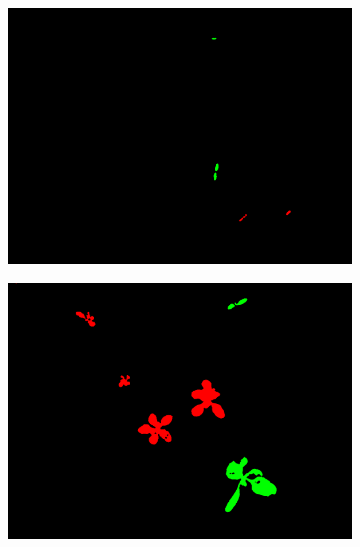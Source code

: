 \documentclass[letterpaper, 10 pt, conference]{ieeeconf}  %
\begin{document}
\begin{figure}
        \begin{subfigure}[b]{0.31\linewidth}
    \includegraphics[width=\linewidth]{pics/bonn/annotations/bonirob_2016-04-28-12-20-29_6_frame217.png}
   		\caption{}
		\label{bonn_lbl}    		
   \end{subfigure}
        \begin{subfigure}[b]{0.31\linewidth}
    \includegraphics[width=\linewidth]{pics/stuttgart/annotations/masks_8mm_fromImages_frame479_GroundTruth_iMap.png}
   		\caption{}
		\label{stuttgart_lbl}    		
   \end{subfigure}
        \begin{subfigure}[b]{0.31\linewidth}

\end{subfigure}
\end{figure}
\end{document}
